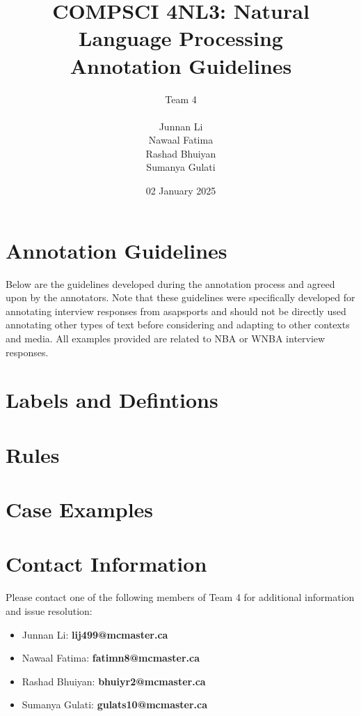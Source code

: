\documentclass[titlepage]{article}
\title{COMPSCI 4NL3: Natural Language Processing\\
Annotation Guidelines}
\author{Team 4\\
\\ Junnan Li
\\ Nawaal Fatima
\\ Rashad Bhuiyan
\\ Sumanya Gulati}
\date{02 January 2025}
\begin{document}
\begin{titlepage}
  \maketitle
\end{titlepage}

\newpage

\section{Annotation Guidelines}
Below are the guidelines developed during the annotation process and agreed upon 
by the annotators. Note that these guidelines were specifically developed for 
annotating interview responses from asapsports and should not be directly used 
annotating other types of text before considering and adapting to other contexts and media. 
All examples provided are related to NBA or WNBA interview responses.

\section{Labels and Defintions}

\section{Rules}

\section{Case Examples}

\section{Contact Information}
Please contact one of the following members of Team 4 for additional information and issue resolution:
\begin{itemize}
    \item Junnan Li: \textbf{lij499@mcmaster.ca}
    \item Nawaal Fatima: \textbf{fatimn8@mcmaster.ca}
    \item Rashad Bhuiyan: \textbf{bhuiyr2@mcmaster.ca}
    \item Sumanya Gulati: \textbf{gulats10@mcmaster.ca}
\end{itemize}
\end{document}
